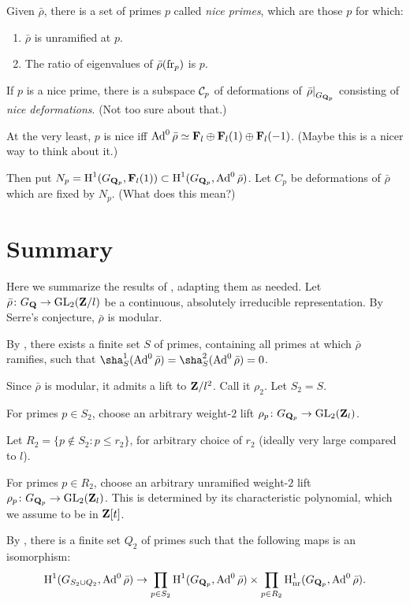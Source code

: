 Given $\bar\rho$, there is a set of primes $p$ called \emph{nice primes}, which 
are those $p$ for which:
\begin{enumerate}
\item
$\bar\rho$ is unramified at $p$.

\item
The ratio of eigenvalues of $\bar\rho(\mathrm{fr}_p)$ is $p$. 
\end{enumerate}
If $p$ is a nice prime, there is a subspace $\mathcal{C}_p$ of deformations of 
$\left.\bar\rho\right|_{G_{\mathbf{Q}_p}}$ consisting of \emph{nice deformations}. 
(Not too sure about that.)

At the very least, $p$ is nice iff 
$\operatorname{Ad}^0 \bar\rho\simeq \mathbf{F}_l\oplus \mathbf{F}_l(1)\oplus \mathbf{F}_l(-1)$. (Maybe this is a 
nicer way to think about it.)

Then put $N_p = \operatorname{H}^1(G_{\mathbf{Q}_p},\mathbf{F}_l(1))\subset \operatorname{H}^1(G_{\mathbf{Q}_p},\operatorname{Ad}^0\bar\rho)$. 
Let $C_p$ be deformations of $\bar\rho$ which are fixed by $N_p$. (What does 
this mean?)





\section{Summary}

Here we summarize the results of 
\cite{khare-larsen-ramakrishna-2005,pande-2011}, adapting them as needed. Let 
$\bar\rho\colon G_{\mathbf{Q}} \to \operatorname{GL}_2(\mathbf{Z}/l)$ be a continuous, absolutely irreducible 
representation. By Serre's conjecture, $\bar\rho$ is modular. 

By \cite[Lem.~6]{khare-larsen-ramakrishna-2005}, there exists a finite set $S$ 
of primes, containing all primes at which $\bar\rho$ ramifies, such that 
$\sha_S^1(\Ad^0\bar\rho) = \sha_S^2(\Ad^0\bar\rho) = 0$. 

Since $\bar\rho$ is modular, it admits a lift to $\mathbf{Z}/l^2$. Call it $\rho_2$. 
Let $S_2 = S$. 

For primes $p\in S_2$, choose an arbitrary weight-$2$ lift 
$\rho_p\colon G_{\mathbf{Q}_p} \to \operatorname{GL}_2(\mathbf{Z}_l)$. 

Let $R_2 = \{p\notin S_2 : p\leqslant r_2\}$, for arbitrary choice of $r_2$ 
(ideally very large compared to $l$). 

For primes $p\in R_2$, choose an arbitrary unramified weight-$2$ lift 
$\rho_p\colon G_{\mathbf{Q}_p} \to \operatorname{GL}_2(\mathbf{Z}_l)$. This is determined by its 
characteristic polynomial, which we assume to be in $\mathbf{Z}[t]$. 

By \cite[Lem.~8]{khare-larsen-ramakrishna-2005}, there is a finite set $Q_2$ of 
primes such that the following maps is an isomorphism:
\[
	\operatorname{H}^1(G_{S_2\cup Q_2},\operatorname{Ad}^0\bar\rho) 
		\to \prod_{p\in S_2} \operatorname{H}^1(G_{\mathbf{Q}_p},\operatorname{Ad}^0\bar\rho)\times \prod_{p\in R_2} \operatorname{H}^1_{\mathrm{nr}}(G_{\mathbf{Q}_p},\operatorname{Ad}^0\bar\rho) .
\]

